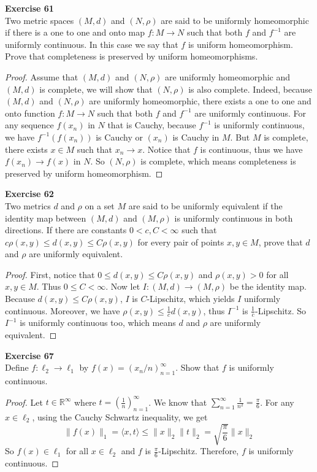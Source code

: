 \documentclass[12pt, a4paper]{article}
\theoremstyle{plain}
\newcommand{\R}{\mathbb{R}}
\newenvironment{exercise}[2][Exercise]
    { \begin{mdframed}[backgroundcolor=gray!20] \textbf{#1 #2} \\}
    {  \end{mdframed}}
\begin{document}
\begin{exercise}{61}
Two metric spaces $(M,d)$ and $(N,\rho)$ are said to be uniformly homeomorphic if there is a one to one and onto map $f:M\rightarrow N$ such that both $f$ and $f^{-1}$ are uniformly continuous. In this case we say that $f$ is uniform homeomorphism. Prove that completeness is preserved by uniform homeomorphisms.
\end{exercise}
	\begin{proof}
	Assume that $(M,d)$ and $(N,\rho)$ are uniformly homeomorphic and $(M,d)$ is complete, we will show that $(N,\rho)$ is also complete. Indeed, because $(M,d)$ and $(N,\rho)$ are uniformly homeomorphic, there exists a one to one and onto function $f:M\rightarrow N$ such that both $f$ and $f^{-1}$ are uniformly continuous. For any sequence $f(x_n)$ in $N$ that is Cauchy, because $f^{-1}$ is uniformly continuous, we have $f^{-1}(f(x_n))$ is Cauchy or $(x_n)$ is Cauchy in $M$. But $M$ is complete, there exists $x\in M$ such that $x_n\rightarrow x$. Notice that $f$ is continuous, thus we have $f(x_n)\rightarrow f(x)$ in $N$. So $(N,\rho)$ is complete, which means completeness is preserved by uniform homeomorphism.
	\end{proof}
	
\begin{exercise}{62}
Two metrics $d$ and $\rho$ on a set $M$ are said to be uniformly equivalent if the identity map between $(M,d)$ and $(M,\rho)$ is uniformly continuous in both directions. If there are constants $0<c, C<\infty$ such that $c\rho(x,y)\leq d(x,y)\leq C\rho(x,y)$ for every pair of points $x,y\in M$, prove that $d$ and $\rho$ are uniformly equivalent.
\end{exercise}
	\begin{proof}
	First, notice that $0\leq d(x,y)\leq C\rho(x,y)$ and $\rho(x,y)>0$ for all $x,y\in M$. Thus $0\leq C<\infty$. Now let $I:(M,d)\rightarrow (M,\rho)$ be the identity map. Because $d(x,y)\leq C\rho(x,y)$, $I$ is $C$-Lipschitz, which yields $I$ uniformly continuous. Moreover, we have $\rho(x,y)\leq \frac{1}{c}d(x,y)$, thus $I^{-1}$ is $\frac{1}{c}$-Lipschitz. So $I^{-1}$ is uniformly continuous too, which means $d$ and $\rho$ are uniformly equivalent.
	\end{proof}
	
\pagebreak

\begin{exercise}{67}
Define $f:\ell_2\rightarrow \ell_1$ by $f(x)=(x_n/n)_{n=1}^\infty$. Show that $f$ is uniformly continuous.
\end{exercise}
	\begin{proof}
	Let $t\in \R^\infty$ where $t=(\frac{1}{n})_{n=1}^\infty$. We know that $\sum_{n=1}^{\infty}{\frac{1}{n^2}}=\frac{\pi}{6}$. For any $x\in\ell_2$, using the Cauchy Schwartz inequality, we get
	\[
	\|f(x)\|_1=\langle{x,t}\rangle\leq \|x\|_2\|t\|_2=\sqrt{\frac{\pi}{6}}\|x\|_2
	\]
	So $f(x)\in\ell_1$ for all $x\in\ell_2$ and $f$ is $\frac{\pi}{6}$-Lipschitz. Therefore, $f$ is uniformly continuous.
	\end{proof}
\end{document}
